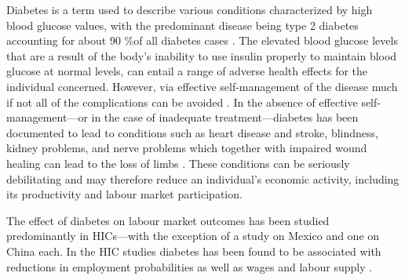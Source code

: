 Diabetes is a term used to describe various conditions characterized by high blood glucose values, with the predominant disease being type 2 diabetes accounting for about 90 \%of all diabetes cases \parencite{Sicree2009}. The elevated
blood glucose levels that are a result of the body's inability to use insulin properly to maintain blood glucose at normal levels, can entail a range of adverse health effects for the individual concerned. However, via effective self-management of the disease much if not all of the complications can be avoided \parencite{Lim2011, Gregg2012}. In the absence of effective self-management---or in the case of inadequate treatment---diabetes has been documented to lead to conditions such as heart disease and stroke, blindness, kidney problems, and nerve problems which together with impaired wound healing can lead to the loss of limbs \parencite{Reynoso-Noveron2011}. These conditions can be seriously debilitating and may therefore reduce an individual's economic activity, including its productivity and labour market participation.

The effect of diabetes on labour market outcomes has been studied predominantly in \acp{HIC}---with the exception of a study on Mexico \autocite{Seuring2015} and one on China \parencite{Liu2014} each. In the \ac{HIC} studies diabetes has been found to be associated with reductions in employment probabilities as well as wages and labour supply \parencite{Brown2005,Brown2014,BrownIII2011,Minor2011,Minor2013,Minor2015,Latif2009,Seuring2015a}.

